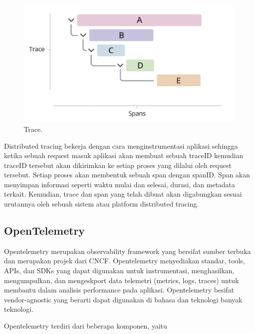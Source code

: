   \begin{figure}[H]
    \centering
      \includegraphics[scale=0.6]{gambar/traces-spans}
      \caption{Trace.}
      \label{Trace}
  \end{figure}

  Distributed tracing bekerja dengan cara menginstrumentasi aplikasi sehingga ketika sebuah request masuk aplikasi akan membuat sebuah traceID kemudian traceID tersebut akan dikirimkan ke setiap proses yang dilalui oleh request tersebut. Setiap proses akan membentuk sebuah span dengan spanID. Span akan menyimpan informasi seperti waktu mulai dan selesai, durasi, dan metadata terkait. Kemudian, trace dan span yang telah dibuat akan digabungkan sesuai urutannya oleh sebuah sistem atau platform distributed tracing.

  \subsection{OpenTelemetry}
  Opentelemetry merupakan observability framework yang bersifat sumber terbuka dan merupakan projek dari CNCF. Opentelemetry menyediakan standar, tools, APIs, dan SDKs yang dapat digunakan untuk instrumentasi, menghasilkan, mengumpulkan, dan mengeskport data telemetri (metrics, logs, traces) untuk membantu dalam analisis performance pada aplikasi. Opentelemetry besifat vendor-agnostic yang berarti dapat digunakan di bahasa dan teknologi banyak teknologi\cite{WhatIsOpentelemetry}.

  Opentelemetry terdiri dari beberapa komponen, yaitu

